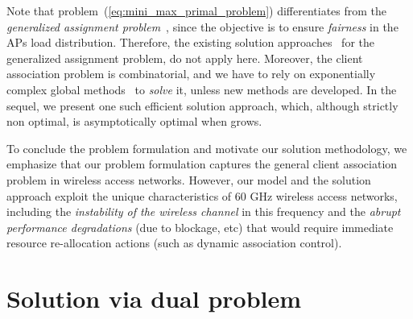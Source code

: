 \documentclass[journal, 10pt, twocolumn]{IEEEtran}
\begin{document}
Note that problem~(\ref{eq:mini_max_primal_problem}) differentiates from the \emph{generalized assignment problem}~\cite[\S~8]{Bertsekas-98}, since the objective is to ensure \emph{fairness} in the APs load distribution. Therefore, the existing solution approaches~\cite[\S~8, \S~10]{Bertsekas-98} for the generalized assignment problem, do not apply here. Moreover, the client association problem is combinatorial, and we have to rely on exponentially complex global methods~\cite{Horst-Pardalos-Toai-00} to \emph{solve} it, unless new methods are developed. In the sequel, we present one such efficient solution approach, which, although strictly non optimal, is asymptotically optimal when  grows. 

To conclude the problem formulation and motivate our solution methodology, we emphasize that our problem formulation captures the general client association problem in wireless access networks. However, our model and the solution approach exploit the unique characteristics of 60 GHz wireless access networks, including the \emph{instability of the wireless channel} in this frequency and the \emph{abrupt performance degradations} (due to blockage, etc) that would require immediate resource re-allocation actions (such as dynamic association control).



\section{Solution via dual problem}\label{sec:dual_prob}
\end{document}
